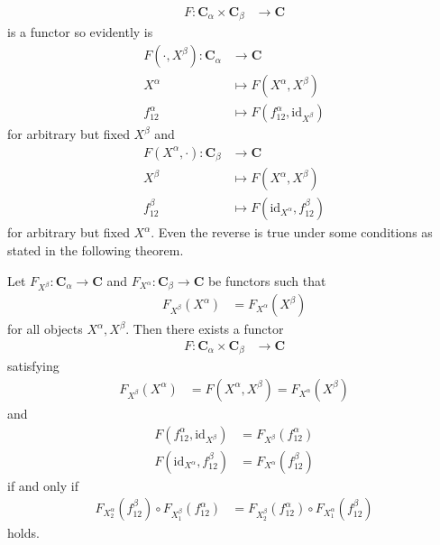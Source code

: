 \begin{align*}
  F
  \colon
  \mathbf{C}_{\alpha}
  \times
  \mathbf{C}_{\beta}
  &\rightarrow
  \mathbf{C}
\end{align*}
is a functor so evidently is
\begin{align*}
  F(\cdot,X^{\beta})
  \colon
  \mathbf{C}_{\alpha}
  &\rightarrow
  \mathbf{C}
  \\
  X^{\alpha}
  &\mapsto
  F(X^{\alpha},X^{\beta})
  \\
  f_{12}^{\alpha}
  &\mapsto
  F(f_{12}^{\alpha},\mathrm{id}_{X^{\beta}})
\end{align*}
for arbitrary but fixed $X^{\beta}$ and
\begin{align*}
  F(X^{\alpha},\cdot)
  \colon
  \mathbf{C}_{\beta}
  &\rightarrow
  \mathbf{C}
  \\
  X^{\beta}
  &\mapsto
  F(X^{\alpha},X^{\beta})
  \\
  f_{12}^{\beta}
  &\mapsto
  F(\mathrm{id}_{X^{\alpha}},f_{12}^{\beta})
\end{align*}
for arbitrary but fixed $X^{\alpha}$. Even the reverse is true under some conditions as stated in the following theorem.
\\
\begin{thm}
\label{thm:bifuncconstr}
Let $F_{X^{\beta}} \colon \mathbf{C}_{\alpha} \rightarrow \mathbf{C}$ and $F_{X^{\alpha}} \colon \mathbf{C}_{\beta} \rightarrow \mathbf{C}$ be functors such that
\begin{align*}
  F_{X^{\beta}}(X^{\alpha})
  &=
  F_{X^{\alpha}}(X^{\beta})
\end{align*}
for all objects $X^{\alpha},X^{\beta}$. Then there exists a functor
\begin{align*}
  F
  \colon
  \mathbf{C}_{\alpha}
  \times
  \mathbf{C}_{\beta}
  &\rightarrow
  \mathbf{C}
\end{align*}
satisfying
\begin{align*}
  F_{X^{\beta}}(X^{\alpha})
  &=
  F(X^{\alpha},X^{\beta})
  =
  F_{X^{\alpha}}(X^{\beta})
\end{align*}
and
\begin{align*}
  F
  \left(
    f_{12}^{\alpha},\mathrm{id}_{X^{\beta}}
  \right)
  &=
  F_{X^{\beta}}(f_{12}^{\alpha})
  \\
  F
  \left(
    \mathrm{id}_{X^{\alpha}},f_{12}^{\beta}
  \right)
  &=
  F_{X^{\alpha}}(f_{12}^{\beta})
\end{align*}
if and only if
\begin{align*}
  F_{X_{2}^{\alpha}}(f_{12}^{\beta})
  \circ
  F_{X_{1}^{\beta}}(f_{12}^{\alpha})
  &=
  F_{X_{2}^{\beta}}(f_{12}^{\alpha})
  \circ
  F_{X_{1}^{\alpha}}(f_{12}^{\beta})
\end{align*}
holds.
\end{thm}
